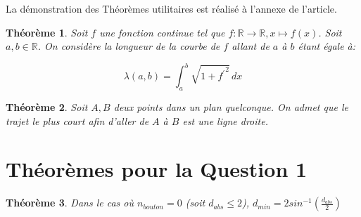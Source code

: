 \documentclass{amsart}
\newtheorem{theorem}{Théorème}[section]
\theoremstyle{definition}
\theoremstyle{remark}
\numberwithin{equation}{section}
\begin{document}
La démonstration des Théorèmes utilitaires est réalisé à l'annexe de l'article.

\begin{theorem}
  Soit $f$ une fonction continue tel que $f:\mathbb{R}\longrightarrow \mathbb{R}, x\longmapsto f(x)$. Soit $a,b\in\mathbb{R}$. On considère la longueur de la courbe de $f$ allant de $a$ à $b$ étant égale à:
  
  \[\lambda(a,b)=\int_{a}^{b} \sqrt{1+{f^\prime}^2} \,dx\]
\end{theorem}

\begin{theorem}
  Soit $A,B$ deux points dans un plan quelconque. On admet que le trajet le plus court afin d'aller de $A$ à $B$ est une ligne droite.
\end{theorem}

\section{Théorèmes pour la Question 1}

\begin{theorem}
  Dans le cas où $n_{bouton}=0$ (soit $d_{abs}\le 2$), $d_{min}= 2sin^{-1}(\frac{d_{abs}}{2})$
\end{theorem}
\end{document}

